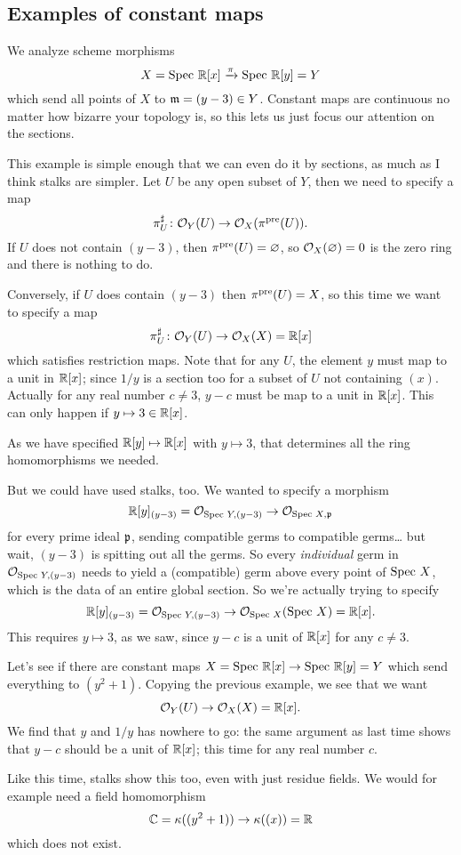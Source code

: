 \subsection{Examples of constant maps}
\begin{example}
	We analyze scheme morphisms
	\[ X = \text{Spec } \mathbb R[x] \xrightarrow{\pi} \text{Spec } \mathbb R[y] = Y \]
	which send all points of $X$ to $\mathfrak m = (y-3) \in Y$.
	Constant maps are continuous no matter how bizarre your topology is,
	so this lets us just focus our attention on the sections.

	This example is simple enough that we can even do it by sections,
	as much as I think stalks are simpler.
	Let $U$ be any open subset of $Y$, then we need to specify a map
	\[ \pi^\sharp_U \colon \mathcal O_Y(U) \to \mathcal O_X(\pi^{\text{pre}}(U)). \]
	If $U$ does not contain $(y-3)$, then $\pi^{\text{pre}}(U) = \varnothing$,
	so $\mathcal O_X(\varnothing) = 0$ is the zero ring and there is nothing to do.

	Conversely, if $U$ does contain $(y-3)$ then $\pi^{\text{pre}}(U) = X$,
	so this time we want to specify a map
	\[ \pi^\sharp_U \colon \mathcal O_Y(U) \to \mathcal O_X(X) = \mathbb R[x] \]
	which satisfies restriction maps.
	Note that for any $U$, the element $y$ must map to a unit in $\mathbb R[x]$;
	since $1/y$ is a section too for a subset of $U$ not containing $(x)$.
	Actually for any real number $c \ne 3$,
	$y-c$ must be map to a unit in $\mathbb R[x]$.
	This can only happen if $y \mapsto 3 \in \mathbb R[x]$.

	As we have specified $\mathbb R[y] \mapsto \mathbb R[x]$ with $y \mapsto 3$,
	that determines all the ring homomorphisms we needed.
\end{example}
But we could have used stalks, too.
We wanted to specify a morphism
\[ \mathbb R[y]_{(y-3)} = \mathcal O_{\text{Spec } Y, (y-3)} \to \mathcal O_{\text{Spec } X, \mathfrak p} \]
for every prime ideal $\mathfrak p$,
sending compatible germs to compatible germs\dots
but wait, $(y-3)$ is spitting out all the germs.
So every \emph{individual} germ in $\mathcal O_{\text{Spec } Y, (y-3)}$
needs to yield a (compatible) germ above every point of $\text{Spec } X$,
which is the data of an entire global section.
So we're actually trying to specify
\[ \mathbb R[y]_{(y-3)} = \mathcal O_{\text{Spec } Y, (y-3)} \to \mathcal O_{\text{Spec } X}(\text{Spec } X) = \mathbb R[x]. \]
This requires $y \mapsto 3$, as we saw,
since $y-c$ is a unit of $\mathbb R[x]$ for any $c \ne 3$.

\begin{example}
	Let's see if there are constant maps
	$X = \text{Spec } \mathbb R[x] \to \text{Spec } \mathbb R[y] = Y$
	which send everything to $(y^2+1)$.
	Copying the previous example, we see that we want
	\[ \mathcal O_Y(U) \to \mathcal O_X(X) = \mathbb R[x]. \]
	We find that $y$ and $1/y$ has nowhere to go:
	the same argument as last time shows that $y-c$ should be a unit of $\mathbb R[x]$;
	this time for any real number $c$.

	Like this time, stalks show this too,
	even with just residue fields.
	We would for example need a field homomorphism
	\[ \mathbb C = \kappa( (y^2+1) ) \to \kappa( (x) ) = \mathbb R \]
	which does not exist.
\end{example}

